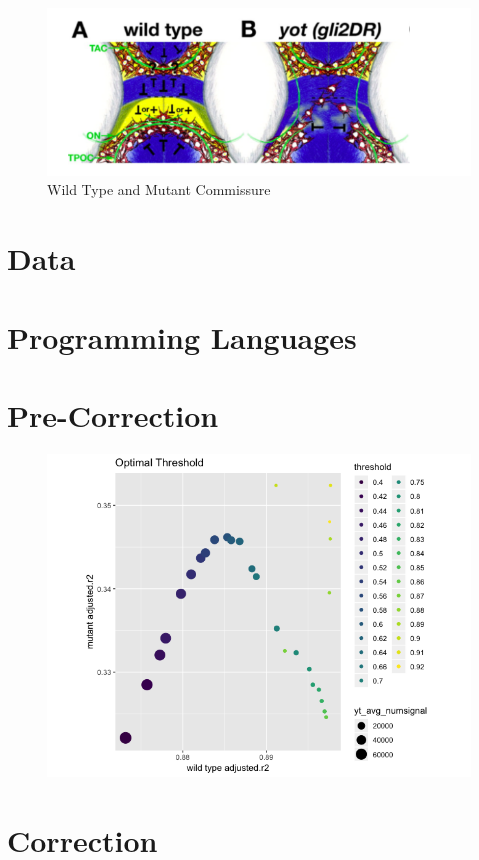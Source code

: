 \documentclass[10pt,letterpaper]{article}
\begin{document}
\begin{figure}[H]
\includegraphics[width=0.9\linewidth]{visualization_paper/wt_yt} \caption{Wild Type and Mutant Commissure}\label{fig:Figure1}
\end{figure}

\section{Data}\label{data}

\section{Programming Languages}\label{programming-languages}

\section{Pre-Correction}\label{pre-correction}

\begin{figure}[H]
\includegraphics[width=0.9\linewidth]{visualization_paper/optimal_threshold2} \end{figure}

\section{Correction}\label{correction}
\end{document}
